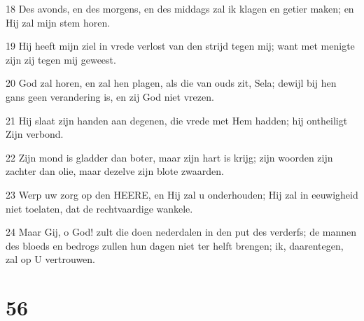 \par 18 Des avonds, en des morgens, en des middags zal ik klagen en getier maken; en Hij zal mijn stem horen.
\par 19 Hij heeft mijn ziel in vrede verlost van den strijd tegen mij; want met menigte zijn zij tegen mij geweest.
\par 20 God zal horen, en zal hen plagen, als die van ouds zit, Sela; dewijl bij hen gans geen verandering is, en zij God niet vrezen.
\par 21 Hij slaat zijn handen aan degenen, die vrede met Hem hadden; hij ontheiligt Zijn verbond.
\par 22 Zijn mond is gladder dan boter, maar zijn hart is krijg; zijn woorden zijn zachter dan olie, maar dezelve zijn blote zwaarden.
\par 23 Werp uw zorg op den HEERE, en Hij zal u onderhouden; Hij zal in eeuwigheid niet toelaten, dat de rechtvaardige wankele.
\par 24 Maar Gij, o God! zult die doen nederdalen in den put des verderfs; de mannen des bloeds en bedrogs zullen hun dagen niet ter helft brengen; ik, daarentegen, zal op U vertrouwen.

\chapter{56}

